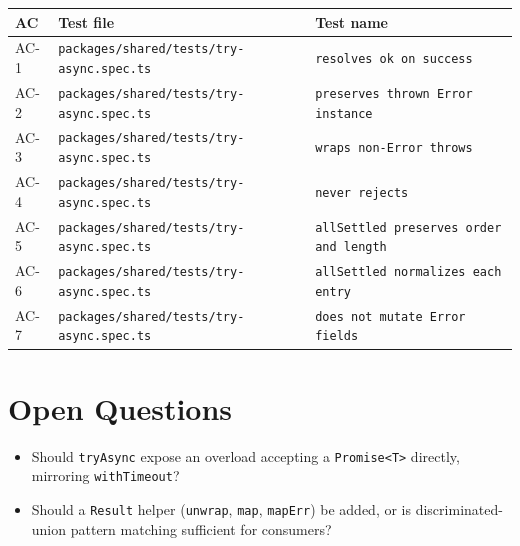 \begin{center}
\begin{tabular}{@{}lll@{}}
\toprule
AC & Test file & Test name \\
\midrule
AC-1 & \texttt{packages/shared/tests/try-async.spec.ts} & \texttt{resolves ok on success} \\
AC-2 & \texttt{packages/shared/tests/try-async.spec.ts} & \texttt{preserves thrown Error instance} \\
AC-3 & \texttt{packages/shared/tests/try-async.spec.ts} & \texttt{wraps non-Error throws} \\
AC-4 & \texttt{packages/shared/tests/try-async.spec.ts} & \texttt{never rejects} \\
AC-5 & \texttt{packages/shared/tests/try-async.spec.ts} & \texttt{allSettled preserves order and length} \\
AC-6 & \texttt{packages/shared/tests/try-async.spec.ts} & \texttt{allSettled normalizes each entry} \\
AC-7 & \texttt{packages/shared/tests/try-async.spec.ts} & \texttt{does not mutate Error fields} \\
\bottomrule
\end{tabular}
\end{center}

\section{Open Questions}
\begin{itemize}[leftmargin=1.2em]
  \item Should \texttt{tryAsync} expose an overload accepting a \texttt{Promise<T>} directly, mirroring \texttt{withTimeout}?
  \item Should a \texttt{Result} helper (\texttt{unwrap}, \texttt{map}, \texttt{mapErr}) be added, or is discriminated-union pattern matching sufficient for consumers?
\end{itemize}


